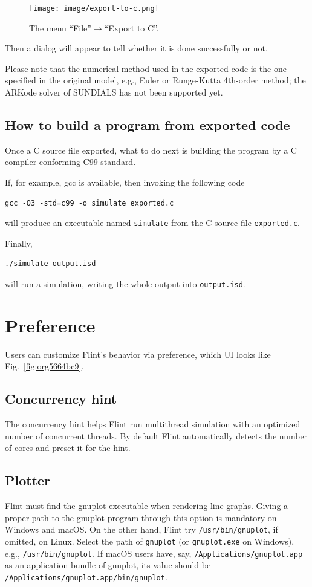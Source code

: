 \documentclass[a4paper,10pt]{report}
\begin{document}
\begin{figure}[htbp]
\centering
\texttt{[image: image/export-to-c.png]}
\caption{\label{fig:org853a3d6}The menu ``File''\(\to\)``Export to C''.}
\end{figure}

Then a dialog will appear to tell whether it is done successfully or not.

Please note that the numerical method used in the exported code is the one
specified in the original model, e.g., Euler or Runge-Kutta 4th-order method;
the ARKode solver of SUNDIALS has not been supported yet.

\subsection{How to build a program from exported code}
\label{sec:org32ba401}
Once a C source file exported, what to do next is building the program by a C compiler
conforming C99 standard.

If, for example, gcc is available, then invoking the following code
\begin{verbatim}
gcc -O3 -std=c99 -o simulate exported.c
\end{verbatim}
will produce an executable named \texttt{simulate} from the C source file \texttt{exported.c}.

Finally,
\begin{verbatim}
./simulate output.isd
\end{verbatim}
will run a simulation, writing the whole output into \texttt{output.isd}.

\section{\label{orga27533c}Preference}
\label{sec:org19aebc7}
Users can customize Flint's behavior via preference, which UI looks like
Fig.~\ref{fig:org5664bc9}.

\subsection{Concurrency hint}
\label{sec:orgcbf54c7}
The concurrency hint helps Flint run multithread simulation with an optimized number
of concurrent threads. By default Flint automatically detects the number of cores and
preset it for the hint.

\subsection{Plotter}
\label{sec:org4c58946}
Flint must find the gnuplot executable when rendering line graphs.
Giving a proper path to the gnuplot program through this option is mandatory on
Windows and macOS. On the other hand, Flint try \texttt{/usr/bin/gnuplot}, if
omitted, on Linux.
Select the path of \texttt{gnuplot} (or \texttt{gnuplot.exe} on Windows), e.g.,
\texttt{/usr/bin/gnuplot}. If macOS users have, say,
\texttt{/Applications/gnuplot.app} as an application bundle of gnuplot,
its value should be \texttt{/Applications/gnuplot.app/bin/gnuplot}.
\end{document}
